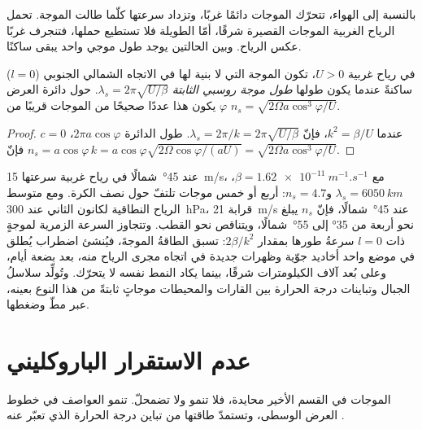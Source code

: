 بالنسبة إلى الهواء، تتحرّك الموجات دائمًا غربًا، وتزداد سرعتها كلّما طالت
الموجة. تحمل الرياح الغربية الموجات القصيرة شرقًا، أمّا الطويلة فلا
تستطيع حملها، فتنجرف غربًا عكس الرياح. وبين الحالتين يوجد طول موجي واحد
يبقى ساكنًا.

\begin{proposition}\label{prop:b3:atmospheric-dynamics:stationary}
في رياح غربية $U > 0$، تكون الموجة التي لا بنية لها في الاتجاه الشمالي الجنوبي ($l = 0$)
ساكنةً عندما يكون طولها \emph{طول موجة روسبي
الثابتة} $\lambda_s =
2\pi\sqrt{U/\beta}$. حول دائرة العرض $\varphi$ يكون هذا عددًا صحيحًا
من الموجات قريبًا من $n_s = \sqrt{2\Omega a\cos^3\varphi/U}$.
\end{proposition}

\begin{proof}
$c = 0$ عندما $k^2 = \beta/U$، فإنّ $\lambda_s = 2\pi/k = 2\pi\sqrt{U/\beta}$.
طول الدائرة $2\pi a\cos\varphi$، فإنّ $n_s = a\cos\varphi\,k =
a\cos\varphi\sqrt{2\Omega\cos\varphi/(aU)} = \sqrt{2\Omega a\cos^3\varphi/U}$.
\end{proof}

عند \ang{45}~شمالًا في رياح غربية سرعتها \qty{15}{m/s}، مع $\beta =
\qty{1.62e-11}{m^{-1}.s^{-1}}$، $\lambda_s = \qty{6050}{km}$ و$n_s =
4.7$: أربع أو خمس موجات تلتفّ حول نصف الكرة. ومع متوسط الرياح النطاقية لكانون الثاني
عند \qty{300}{hPa}، قرابة \qty{21}{m/s} عند \ang{45}~شمالًا، فإنّ $n_s$ يبلغ
نحو أربعة من \ang{35} إلى \ang{55}~شمالًا، ويتناقص نحو القطب. وتتجاوز السرعة الزمرية
لموجةٍ ذات $l = 0$ سرعةُ طورها بمقدار $2\beta/k^2$: تسبق الطاقةُ الموجةَ،
فيُنشئ اضطراب يُطلق في موضع واحد أخاديد جوّية وظهرات جديدة في اتجاه مجرى الرياح منه،
بعد بضعة أيام، وعلى بُعد آلاف الكيلومترات شرقًا،
بينما يكاد النمط نفسه لا يتحرّك. وتُولِّد سلاسلُ الجبال
وتباينات درجة الحرارة بين القارات والمحيطات موجاتٍ ثابتةً من هذا النوع بعينه،
عبر مطّ 
وضغطها.


\section{عدم الاستقرار الباروكليني}\label{sec:b3:atmospheric-dynamics:baroclinic}

الموجات في القسم الأخير محايدة، فلا تنمو ولا تضمحلّ.
تنمو العواصف في خطوط العرض الوسطى، وتستمدّ طاقتها من
تباين درجة الحرارة الذي تعبّر عنه .

